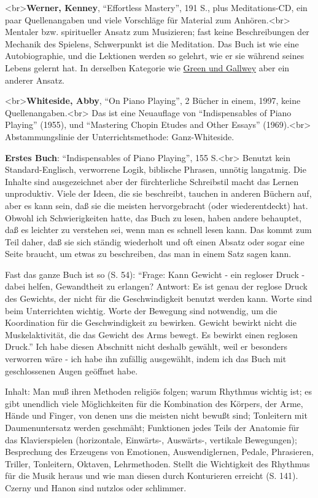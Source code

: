 \label{Werner}

<br>\textbf{Werner, Kenney}, \enquote{Effortless Mastery}, 191 S., plus Meditations-CD, ein paar Quellenangaben und viele Vorschläge für Material zum Anhören.<br>
Mentaler bzw. spiritueller Ansatz zum Musizieren; fast keine Beschreibungen der Mechanik des Spielens, Schwerpunkt ist die Meditation.
Das Buch ist wie eine Autobiographie, und die Lektionen werden so gelehrt, wie er sie während seines Lebens gelernt hat.
In derselben Kategorie wie \hyperref[Green]{Green und Gallwey} aber ein anderer Ansatz.


\label{Whiteside}

<br>\textbf{Whiteside, Abby}, \enquote{On Piano Playing}, 2 Bücher in einem, 1997, keine Quellenangaben.<br>
Das ist eine Neuauflage von \enquote{Indispensables of Piano Playing} (1955), und \enquote{Mastering Chopin Etudes and Other Essays} (1969).<br>
Abstammungslinie der Unterrichtsmethode: Ganz-Whiteside.

\textbf{Erstes Buch}: \enquote{Indispensables of Piano Playing}, 155 S.<br>
Benutzt kein Standard-Englisch, verworrene Logik, biblische Phrasen, unnötig langatmig.
Die Inhalte sind ausgezeichnet aber der fürchterliche Schreibstil macht das Lernen unproduktiv.
Viele der Ideen, die sie beschreibt, tauchen in anderen Büchern auf, aber es kann sein, daß sie die meisten hervorgebracht (oder wiederentdeckt) hat.
Obwohl ich Schwierigkeiten hatte, das Buch zu lesen, haben andere behauptet, daß es leichter zu verstehen sei, wenn man es schnell lesen kann.
Das kommt zum Teil daher, daß sie sich ständig wiederholt und oft einen Absatz oder sogar eine Seite braucht, um etwas zu beschreiben, das man in einem Satz sagen kann.

Fast das ganze Buch ist so (S. 54): \enquote{Frage: Kann Gewicht - ein regloser Druck - dabei helfen, Gewandtheit zu erlangen?
Antwort: Es ist genau der reglose Druck des Gewichts, der nicht für die Geschwindigkeit benutzt werden kann.
Worte sind beim Unterrichten wichtig.
Worte der Bewegung sind notwendig, um die Koordination für die Geschwindigkeit zu bewirken.
Gewicht bewirkt nicht die Muskelaktivität, die das Gewicht des Arms bewegt.
Es bewirkt einen reglosen Druck.}
Ich habe diesen Abschnitt nicht deshalb gewählt, weil er besonders verworren wäre - ich habe ihn zufällig ausgewählt, indem ich das Buch mit geschlossenen Augen geöffnet habe.

Inhalt: Man muß ihren Methoden religiös folgen; warum Rhythmus wichtig ist; es gibt unendlich viele Möglichkeiten für die Kombination des Körpers, der Arme, Hände und Finger, von denen uns die meisten nicht bewußt sind; Tonleitern mit Daumenuntersatz werden geschmäht; Funktionen jedes Teils der Anatomie für das Klavierspielen (horizontale, Einwärts-, Auswärts-, vertikale Bewegungen); Besprechung des Erzeugens von Emotionen, Auswendiglernen, Pedale, Phrasieren, Triller, Tonleitern, Oktaven, Lehrmethoden.
Stellt die Wichtigkeit des Rhythmus für die Musik heraus und wie man diesen durch Konturieren erreicht (S. 141).
Czerny und Hanon sind nutzlos oder schlimmer.

